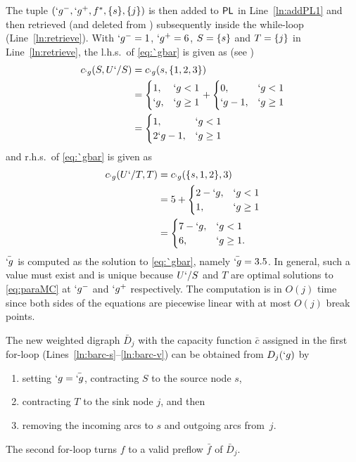 \documentclass[conference,letterpaper]{IEEEtran}
\begin{document}
The tuple $(`g^-,`g^+,f^*,\{s\},\{j\})$ is then added to $\DataSty{PL}$ in Line~\ref{ln:addPL1}
and then retrieved (and deleted from ) subsequently inside the while-loop (Line~\ref{ln:retrieve}). %
With $`g^-=1$,
$`g^+=6$, $S=\{s\}$ and $T=\{j\}$ in Line~\ref{ln:retrieve},
the l.h.s.\ of \eqref{eq:`gbar} is given as (see )
\begin{align*}
	c_{`g}(S,U`/S) &= c_{`g}(s, \{1,2,3\})\\ &= 
	\begin{cases}
		1, &`g<1\\
		`g, &`g\geq 1
	\end{cases}
	+
	\begin{cases}
		0, & `g<1\\
		`g-1, & `g\geq 1
	\end{cases}\\
&= 	\begin{cases}
	1, & `g<1\\
	2`g-1, & `g\geq 1
\end{cases}
\end{align*}
and r.h.s.\ of \eqref{eq:`gbar} is given as
\begin{align*}
	c_{`g}(U`/T,T) &= c_{`g}(\{s,1,2\},3)\\ &= 
	5
	+
	\begin{cases}
		2-`g, & `g<1\\
		1, & `g\geq 1
	\end{cases}\\
	&= 	\begin{cases}
		7-`g, & `g<1\\
		6, & `g\geq 1.
	\end{cases}
\end{align*}
$\bar {`g}$ is computed as the solution to \eqref{eq:`gbar}, namely $\bar{`g}=3.5$. In general, such a value must exist and is unique because $U`/S$ and $T$ are optimal solutions to \eqref{eq:paraMC}
at $`g^-$ and $`g^+$ respectively. The computation is in $O(j)$ time since both sides of the
equations are piecewise linear with at most $O(j)$ break points.

The new weighted digraph $\bar{D}_j$ with the capacity function $\bar{c}$ assigned in the first
for-loop (Lines~\ref{ln:barc-s}--\ref{ln:barc-v}) can be obtained from $D_j(`g)$ by 
\begin{enumerate}
	\item setting $`g=\bar{`g}$, contracting $S$ to the source node $s$,
	\item contracting $T$ to the sink node $j$, and then
	\item removing the incoming
	arcs to $s$ and outgoing arcs from~$j$.
\end{enumerate}
 The second for-loop turns $f$ to a valid preflow $\bar{f}$ of $\bar{D}_j$. 
\end{document}
